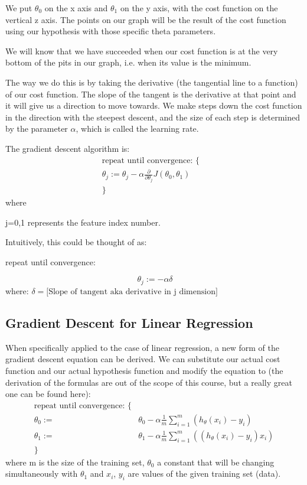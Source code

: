 We put $\theta_0$ on the x axis and $\theta_1$ on the y axis, with the cost function on the vertical z axis. The points on our graph will be the result of the cost function using our hypothesis with those specific theta parameters.

We will know that we have succeeded when our cost function is at the very bottom of the pits in our graph, i.e. when its value is the minimum.

The way we do this is by taking the derivative (the tangential line to a function) of our cost function. The slope of the tangent is the derivative at that point and it will give us a direction to move towards. We make steps down the cost function in the direction with the steepest descent, and the size of each step is determined by the parameter $\alpha$, which is called the learning rate.

The gradient descent algorithm is:
\begin{align*}
  \text{repeat until convergence: } \lbrace & \\
\theta_j := \theta_j - \alpha \frac{\partial}{\partial \theta_j} J(\theta_0, \theta_1)
  \\
  \rbrace &
\end{align*}
where

j=0,1 represents the feature index number.

Intuitively, this could be thought of as:

repeat until convergence:

\[\
\theta_j := -\alpha \delta
\]
where: $\delta = \text{[Slope of tangent aka derivative in j dimension]}$
\subsection{Gradient Descent for Linear Regression}
When specifically applied to the case of linear regression, a new form of the gradient descent equation can be derived. We can substitute our actual cost function and our actual hypothesis function and modify the equation to (the derivation of the formulas are out of the scope of this course, but a really great one can be found here):
\begin{align*}
  \text{repeat until convergence: } \lbrace & \\
  \theta_0 := & \theta_0 - \alpha \frac{1}{m} \sum\limits_{i=1}^{m}(h_\theta(x_{i}) - y_{i}) \\
  \theta_1 := & \theta_1 - \alpha \frac{1}{m} \sum\limits_{i=1}^{m}\left((h_\theta(x_{i}) - y_{i}) x_{i}\right) \\
  \rbrace &
\end{align*}
where m is the size of the training set, $\theta_0$ a constant that will be changing simultaneously with $\theta_1$ and $x_{i}$, $y_{i}$ are values of the given training set (data).

